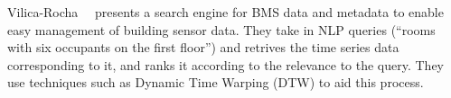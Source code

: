 

Vilica-Rocha~\etal~\cite{villca2021towards} presents a search engine for BMS data and metadata to enable easy management of building sensor data. They take in NLP queries (\eg ``rooms with six occupants on the first floor'') and retrives the time series data corresponding to it, and ranks it according to the relevance to the query. They use techniques such as Dynamic Time Warping (DTW) to aid this process. 








